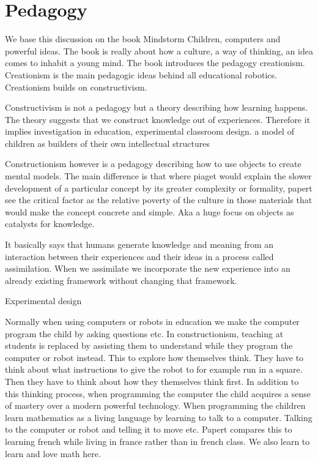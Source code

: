 \chapter{Pedagogy}
We base this discussion on the book Mindstorm Children, computers and powerful ideas. The book is really about how a culture, a way of thinking, an idea comes to inhabit a young mind. The book introduces the pedagogy creationism. Creationism is the main pedagogic ideas behind all educational robotics. Creationism builds on constructivism.

Constructivism is not a pedagogy but a theory describing how learning happens. The theory suggests that we construct knowledge out of experiences. Therefore it implies investigation in education, experimental classroom design. a model of children as builders of their own intellectual structures

Constructionism however is a pedagogy describing how to use objects to create mental models. The main difference is that where piaget would explain the slower development of a particular concept by its greater complexity or formality, papert see the critical factor as the relative poverty of the culture in those materials that would make the concept concrete and simple. Aka a huge focus on objects as catalysts for knowledge.

It basically says that humans generate knowledge and meaning from an interaction between their experiences and their ideas in a process called assimilation. When we assimilate we incorporate the new experience into an already existing framework without changing that framework. 

Experimental design

Normally when using computers or robots in education we make the computer program the child by asking questions etc. In constructionism, teaching at students is replaced by assisting them to understand while they program the computer or robot instead. This to explore how themselves think. They have to think about what instructions to give the robot to for example run in a square. Then they have to think about how they themselves think first. In addition to this thinking process, when programming the computer the child acquires a sense of mastery over a modern powerful technology. When programming the children learn mathematics as a living language by learning to talk to a computer. Talking to the computer or robot and telling it to move etc. Papert compares this to learning french while living in france rather than in french class. We also learn to learn and love math here. 

